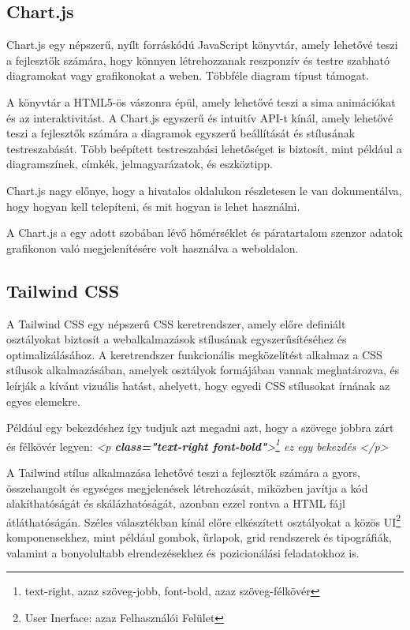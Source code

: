 \documentclass[
]{thesis-ekf}
\theoremstyle{definition}
\theoremstyle{remark}
\begin{document}
	\subsection{Chart.js}
	Chart.js egy népszerű, nyílt forráskódú JavaScript könyvtár, amely lehetővé teszi a fejlesztők számára, hogy könnyen létrehozzanak reszponzív és testre szabható diagramokat vagy grafikonokat a weben. Többféle diagram típust támogat.
	
	A könyvtár a HTML5-ös vászonra épül, amely lehetővé teszi a sima animációkat és az interaktivitást. A Chart.js egyszerű és intuitív API-t kínál, amely lehetővé teszi a fejlesztők számára a diagramok egyszerű beállítását és stílusának testreszabását. Több beépített testreszabási lehetőséget is biztosít, mint például a diagramszínek, címkék, jelmagyarázatok, és eszköztipp.\cite{chartJS}
	
	Chart.js nagy előnye, hogy a hivatalos oldalukon részletesen le van dokumentálva, hogy hogyan kell telepíteni, és mit hogyan is lehet használni.
	
	A Chart.js a egy adott szobában lévő hőmérséklet és páratartalom szenzor adatok grafikonon való megjelenítésére volt használva a weboldalon.
	
	\subsection{Tailwind CSS}\label{tailwind}
	A Tailwind CSS egy népszerű CSS keretrendszer, amely előre definiált osztályokat biztosít a webalkalmazások stílusának egyszerűsítéséhez és optimalizálásához. A keretrendszer funkcionális megközelítést alkalmaz a CSS stílusok alkalmazásában, amelyek osztályok formájában vannak meghatározva, és leírják a kívánt vizuális hatást, ahelyett, hogy egyedi CSS stílusokat írnának az egyes elemekre.
	
	Például egy bekezdéshez így tudjuk azt megadni azt, hogy a szövege jobbra zárt és félkövér legyen: \emph{<p \textbf{class="text-right font-bold"}>\footnote{text-right, azaz szöveg-jobb, font-bold, azaz szöveg-félkövér} ez egy bekezdés </p>}
	
	A Tailwind stílus alkalmazása lehetővé teszi a fejlesztők számára a gyors, összehangolt és egységes megjelenések létrehozását, miközben javítja a kód alakíthatóságát és skálázhatóságát, azonban ezzel rontva a HTML fájl átláthatóságán. Széles választékban kínál előre elkészített osztályokat a közös UI\footnote{User Inerface: azaz Felhasználói Felület} komponensekhez, mint például gombok, űrlapok, grid rendszerek és tipográfiák, valamint a bonyolultabb elrendezésekhez és pozicionálási feladatokhoz is.\cite{tailwind-docs}
	
\end{document}
